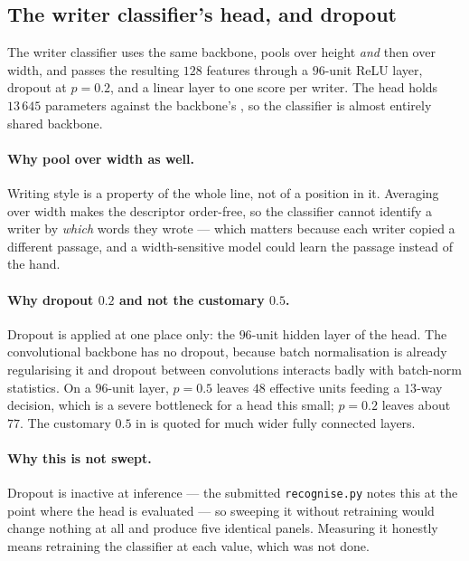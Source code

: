 \documentclass[11pt,a4paper]{article}
\begin{document}
\subsection{The writer classifier's head, and dropout}

The writer classifier uses the same backbone, pools over height \emph{and} then
over width, and passes the resulting $128$ features through a $96$-unit ReLU
layer, dropout at $p = 0.2$, and a linear layer to one score per writer. The
head holds $13\,645$ parameters against the backbone's \ArchBackboneParams{},
so the classifier is almost entirely shared backbone.

\paragraph{Why pool over width as well.} Writing style is a property of the
whole line, not of a position in it. Averaging over width makes the descriptor
order-free, so the classifier cannot identify a writer by \emph{which} words
they wrote --- which matters because each writer copied a different passage, and
a width-sensitive model could learn the passage instead of the hand.

\paragraph{Why dropout $0.2$ and not the customary $0.5$.} Dropout
\cite[p.~1930]{srivastava2014} is applied at one place only: the $96$-unit
hidden layer of the head. The convolutional backbone has no dropout, because
batch normalisation is already regularising it and dropout between convolutions
interacts badly with batch-norm statistics. On a $96$-unit layer, $p = 0.5$
leaves $48$ effective units feeding a $13$-way decision, which is a severe
bottleneck for a head this small; $p = 0.2$ leaves about $77$. The customary
$0.5$ in \cite{srivastava2014} is quoted for much wider fully connected layers.

\paragraph{Why this is not swept.} Dropout is inactive at inference --- the
submitted \texttt{recognise.py} notes this at the point where the head is
evaluated --- so sweeping it without retraining would change nothing at all and
produce five identical panels. Measuring it honestly means retraining the
classifier at each value, which was not done.
\end{document}
